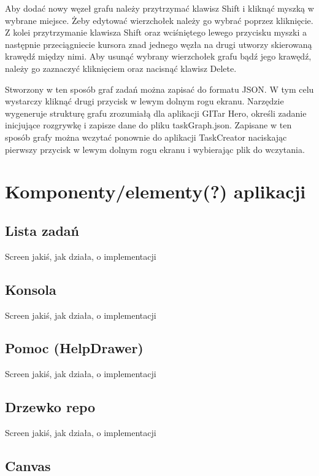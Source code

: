 \documentclass[11pt,a4paper,polish,thesis]{dcsbook}
\begin{document}
	Aby dodać nowy węzeł grafu należy przytrzymać klawisz Shift i kliknąć myszką w wybrane miejsce. Żeby edytować wierzchołek należy go wybrać poprzez kliknięcie. Z kolei przytrzymanie klawisza Shift oraz wciśniętego lewego przycisku myszki a następnie przeciągniecie kursora znad jednego węzła na drugi utworzy skierowaną krawędź między nimi. Aby usunąć wybrany wierzchołek grafu bądź jego krawędź, należy go zaznaczyć kliknięciem oraz nacisnąć klawisz Delete. 
	
	Stworzony w ten sposób graf zadań można zapisać do formatu JSON. W tym celu wystarczy kliknąć drugi przycisk w lewym dolnym rogu ekranu. Narzędzie wygeneruje strukturę grafu zrozumiałą dla aplikacji GITar Hero, określi zadanie inicjujące rozgrywkę i zapisze dane do pliku taskGraph.json. Zapisane w ten sposób grafy można wczytać ponownie do aplikacji TaskCreator naciskając pierwszy przycisk w lewym dolnym rogu ekranu i wybierając plik do wczytania.
	
	\section{Komponenty/elementy(?) aplikacji}
	
	\subsection{Lista zadań}
	
	Screen jakiś, jak działa, o implementacji
	
	\subsection{Konsola}
	
	Screen jakiś, jak działa, o implementacji
	
	\subsection{Pomoc (HelpDrawer)}
	
	Screen jakiś, jak działa, o implementacji
	
	\subsection{Drzewko repo}
	
	Screen jakiś, jak działa, o implementacji
	
	\subsection{Canvas}
	
\end{document}
